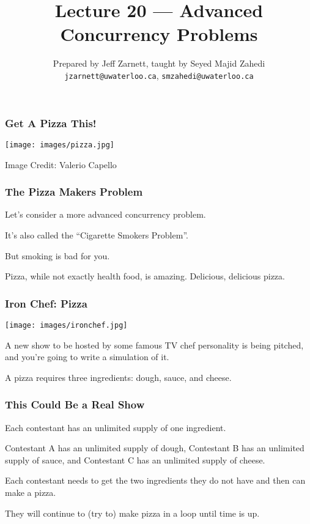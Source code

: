 

\title{Lecture 20 --- Advanced Concurrency Problems }

\author{Prepared by Jeff Zarnett, taught by Seyed Majid Zahedi \\ \small \texttt{jzarnett@uwaterloo.ca}, \texttt{smzahedi@uwaterloo.ca}}
\date{}




\begin{frame}
	\titlepage

\end{frame}


\begin{frame}
	\frametitle{Get A Pizza This!}
	\begin{center}
		\texttt{[image: images/pizza.jpg]}
	\end{center}
	\hfill Image Credit: Valerio Capello

\end{frame}

\begin{frame}
	\frametitle{The Pizza Makers Problem}

	Let's consider a more advanced concurrency problem.

	It's also called the ``Cigarette Smokers Problem''.

	But smoking is bad for you.

	Pizza, while not exactly health food, is amazing. Delicious, delicious pizza.


\end{frame}


\begin{frame}
	\frametitle{Iron Chef: Pizza}
	\begin{center}
		\texttt{[image: images/ironchef.jpg]}
	\end{center}

	A new show to be hosted by some famous TV chef personality is being pitched, and you're going to write a simulation of it.

	A pizza requires three ingredients: dough, sauce, and cheese.

\end{frame}

\begin{frame}
	\frametitle{This Could Be a Real Show}

	Each contestant has an unlimited supply of one ingredient.

	Contestant A has an unlimited supply of dough, Contestant B has an unlimited supply of sauce, and Contestant C has an unlimited supply of cheese.

	Each contestant needs to get the two ingredients they do not have and then can make a pizza.

	They will continue to (try to) make pizza in a loop until time is up.

\end{frame}

